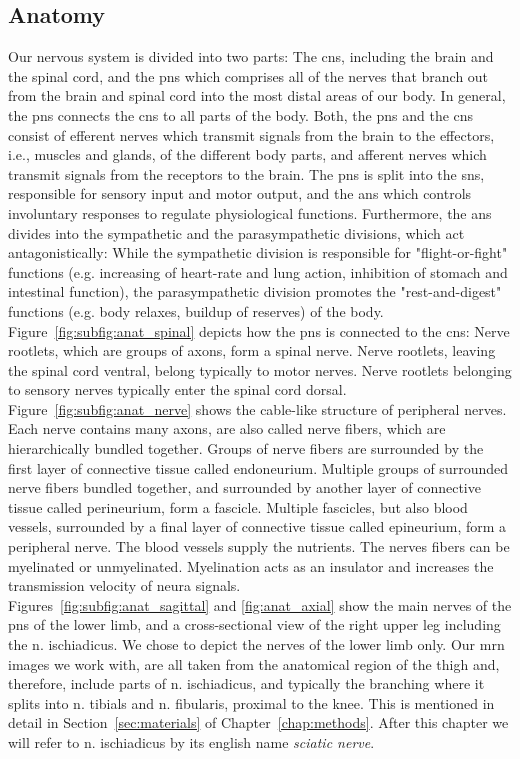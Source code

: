 \subsection{Anatomy}
Our nervous system is divided into two parts: The \gls{cns}, including the brain and the spinal cord, and the \gls{pns} which comprises all of the nerves that branch out from the brain and spinal cord into the most distal areas of our body. In general, the \gls{pns} connects the \gls{cns} to all parts of the body. Both, the \gls{pns} and the \gls{cns} consist of efferent nerves which transmit signals from the brain to the effectors, i.e., muscles and glands, of the different body parts, and afferent nerves which transmit signals from the receptors to the brain. The \gls{pns} is split into the \gls{sns}, responsible for sensory input and motor output, and the \gls{ans} which controls involuntary responses to regulate physiological functions. Furthermore, the \gls{ans} divides into the sympathetic and the parasympathetic divisions, which act antagonistically: While the sympathetic division is responsible for "flight-or-fight" functions (e.g. increasing of heart-rate and lung action, inhibition of stomach and intestinal function), the parasympathetic division promotes the "rest-and-digest" functions (e.g. body relaxes, buildup of reserves) of the body.\\
Figure~\ref{fig:subfig:anat_spinal} depicts how the \gls{pns} is connected to the \gls{cns}: Nerve rootlets, which are groups of axons, form a spinal nerve. Nerve rootlets, leaving the spinal cord ventral, belong typically to motor nerves. Nerve rootlets belonging to sensory nerves typically enter the spinal cord dorsal.\\
Figure~\ref{fig:subfig:anat_nerve} shows the cable-like structure of peripheral nerves. Each nerve contains many axons, are also called nerve fibers, which are hierarchically bundled together. Groups of nerve fibers are surrounded by the first layer of connective tissue called endoneurium. Multiple groups of surrounded nerve fibers bundled together, and surrounded by another layer of connective tissue called perineurium, form a fascicle. Multiple fascicles, but also blood vessels, surrounded by a final layer of connective tissue called epineurium, form a peripheral nerve. The blood vessels supply the nutrients. The nerves fibers can be myelinated or unmyelinated. Myelination acts as an insulator and increases the transmission velocity of neura signals.\\
Figures~\ref{fig:subfig:anat_sagittal} and \ref{fig:anat_axial} show the main nerves of the \gls{pns} of the lower limb, and a cross-sectional view of the right upper leg including the \gls{n.} ischiadicus. We chose to depict the nerves of the lower limb only. Our \acrshort{mrn} images we work with, are all taken from the anatomical region of the thigh and, therefore, include parts of \gls{n.} ischiadicus, and typically the branching where it splits into \gls{n.} tibials and \gls{n.} fibularis, proximal to the knee. This is mentioned in detail in Section~\ref{sec:materials} of Chapter~\ref{chap:methods}. After this chapter we will refer to \gls{n.} ischiadicus by its english name \textit{sciatic nerve}.

